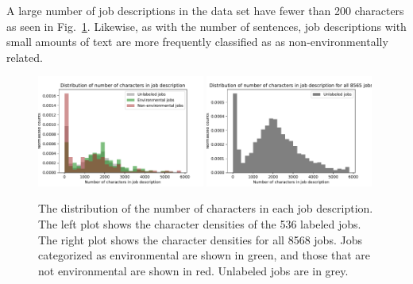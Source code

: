 A large number of job descriptions in the data set have fewer than 200 characters as seen in Fig.~\ref{fig:charlength}. Likewise, as with the number of sentences, job descriptions with small amounts of text are more frequently classified as as non-environmentally related.

\begin{figure}[htbp]
  \centering
    \includegraphics[width=0.49\textwidth]{figures/CharLengthZoomed.pdf}
    \includegraphics[width=0.49\textwidth]{figures/CharLengthAll.pdf}

    \caption[The distribution of the number of characters in each job description]{
    	The distribution of the number of characters in each job description.
    	The left plot shows the character densities of the 536 labeled jobs. The right plot shows the character densities for all 8568 jobs. 
        Jobs categorized as environmental are shown in green, and those that are not environmental are shown in red. Unlabeled jobs are in grey. 
    }
\label{fig:charlength}
\end{figure}
